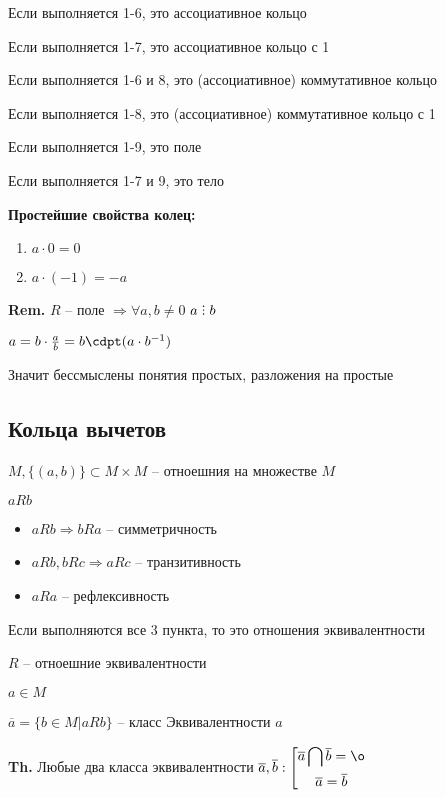\documentclass[14pt, letter paper]{article}
\DeclareRobustCommand{\divby}{%
  \mathrel{\text{\vbox{\baselineskip.65ex\lineskiplimit0pt\hbox{.}\hbox{.}\hbox{.}}}}%
}
\begin{document}
Если выполняется 1-6, это ассоциативное кольцо

Если выполняется 1-7, это ассоциативное кольцо с 1

Если выполняется 1-6 и 8, это (ассоциативное) коммутативное кольцо

Если выполняется 1-8, это (ассоциативное) коммутативное кольцо с 1

Если выполняется 1-9, это поле

Если выполняется 1-7 и 9, это тело

\textbf{Простейшие свойства колец:}

\begin{enumerate}
    \item $a \cdot 0 = 0$
    \item $a \cdot (-1) = -a$
\end{enumerate}

\textbf{Rem.} $R$ -- поле $\Rightarrow \forall a, b \neq 0$ $a \divby b$

$a = b \cdot \frac{a}{b} = b \cdpt (a \cdot b^{-1})$

Значит бессмыслены понятия простых, разложения на простые

\begin{center}
    \section*{Кольца вычетов}
\end{center}

$M, \{ (a, b) \} \subset M \times M$ -- отноешния на множестве $M$

$aRb$

\begin{itemize}
    \item $aRb \Rightarrow bRa$ -- симметричность
    \item $aRb, bRc \Rightarrow aRc$ -- транзитивность
    \item $aRa$ -- рефлексивность
\end{itemize}

Если выполняются все 3 пункта, то это отношения эквивалентности

$R$ -- отноешние эквивалентности

$a \in M$

$\overline{a} = \{b \in M | aRb \}$ -- класс Эквивалентности $a$

\textbf{Th.} Любые два класса эквивалентности $\overline{a}, \overline{b} : \left[ \begin{gathered}
    \overline{a} \bigcap \overline{b} = \o \\
    \overline{a} = \overline{b}
\end{gathered} \right.$
\end{document}
